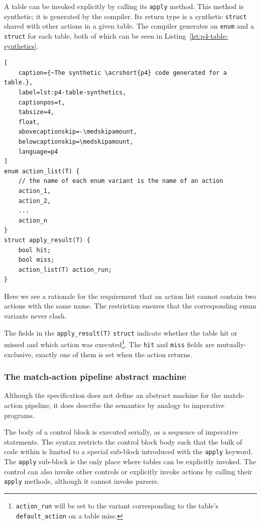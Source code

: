 A table can be invoked explicitly by calling its \texttt{apply} method. This
method is synthetic; it is generated by the compiler. Its return type is a
synthetic \texttt{struct} shared with other actions in a given table. The
compiler generates an \texttt{enum} and a \texttt{struct} for each table, both
of which can be seen in Listing~\ref{lst:p4-table-synthetics}.

\begin{lstlisting}[
	caption={~The synthetic \acrshort{p4} code generated for a table.},
	label=lst:p4-table-synthetics,
	captionpos=t,
	tabsize=4,
	float,
	abovecaptionskip=-\medskipamount,
	belowcaptionskip=\medskipamount,
	language=p4
]
enum action_list(T) {
	// the name of each enum variant is the name of an action
	action_1,
	action_2,
	...
	action_n
}
struct apply_result(T) {
	bool hit;
	bool miss;
	action_list(T) action_run;
}
\end{lstlisting}

Here we see a rationale for the requirement that an action list cannot contain
two actions with the same name. The restriction ensures that the corresponding
enum variants never clash.

The fields in the \texttt{apply\_result(T)} \texttt{struct} indicate whether the
table hit or missed and which action was executed\footnote{\texttt{action\_run}
will be set to the variant corresponding to the table's \texttt{default\_action}
on a table miss.}. The \texttt{hit} and \texttt{miss} fields are
mutually-exclusive, exactly one of them is set when the action returns.

\subsubsection*{The match-action pipeline abstract machine}

Although the \pfs specification does not define an abstract machine for the
match-action pipeline, it does describe the semantics by analogy to imperative
programs.

The body of a control block is executed serially, as a sequence of imperative
statements. The syntax restricts the control block body such that the bulk of
code within is limited to a special sub-block introduced with the \texttt{apply}
keyword. The \texttt{apply} sub-block is the only place where tables can be
explicitly invoked. The control can also invoke other controls or explicitly
invoke actions by calling their \texttt{apply} methods, although it cannot
invoke parsers.

